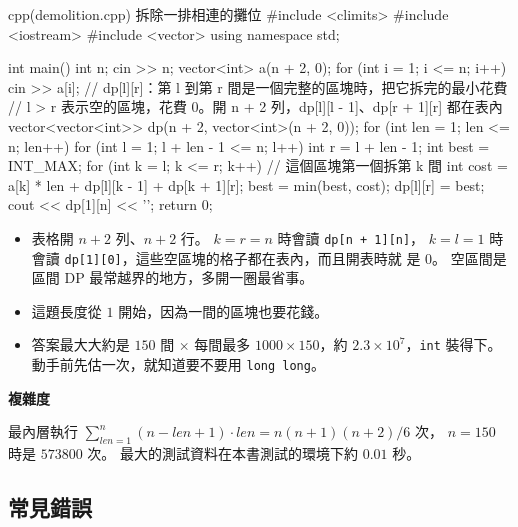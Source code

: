 \begin{example}[label=ex:ivdp-demolish]{cpp}{(demolition.cpp) 拆除一排相連的攤位}
#include <climits>
#include <iostream>
#include <vector>
using namespace std;

int main() {
    int n;
    cin >> n;
    vector<int> a(n + 2, 0);
    for (int i = 1; i <= n; i++) {
        cin >> a[i];
    }
    // dp[l][r]：第 l 到第 r 間是一個完整的區塊時，把它拆完的最小花費
    // l > r 表示空的區塊，花費 0。開 n + 2 列，dp[l][l - 1]、dp[r + 1][r] 都在表內
    vector<vector<int>> dp(n + 2, vector<int>(n + 2, 0));
    for (int len = 1; len <= n; len++) {
        for (int l = 1; l + len - 1 <= n; l++) {
            int r = l + len - 1;
            int best = INT_MAX;
            for (int k = l; k <= r; k++) {    // 這個區塊第一個拆第 k 間
                int cost = a[k] * len + dp[l][k - 1] + dp[k + 1][r];
                best = min(best, cost);
            }
            dp[l][r] = best;
        }
    }
    cout << dp[1][n] << '\n';
    return 0;
}
\end{example}


\begin{itemize}
\item 表格開 $n + 2$ 列、$n + 2$ 行。 $k = r = n$ 時會讀 \texttt{dp[n + 1][n]}，
$k = l = 1$ 時會讀 \texttt{dp[1][0]}，這些空區塊的格子都在表內，而且開表時就
是 $0$。 空區間是區間 DP 最常越界的地方，多開一圈最省事。
\item 這題長度從 $1$ 開始，因為一間的區塊也要花錢。
\item 答案最大大約是 $150$ 間 $\times$ 每間最多 $1000 \times 150$，約
$2.3 \times 10^7$，\texttt{int} 裝得下。 動手前先估一次，就知道要不要用
\texttt{long long}。
\end{itemize}

\textbf{複雜度}

最內層執行 $\sum_{len=1}^{n} (n - len + 1) \cdot len = n(n + 1)(n + 2)/6$ 次，
$n = 150$ 時是 $573800$ 次。 最大的測試資料在本書測試的環境下約 $0.01$ 秒。

\subsection{常見錯誤}


